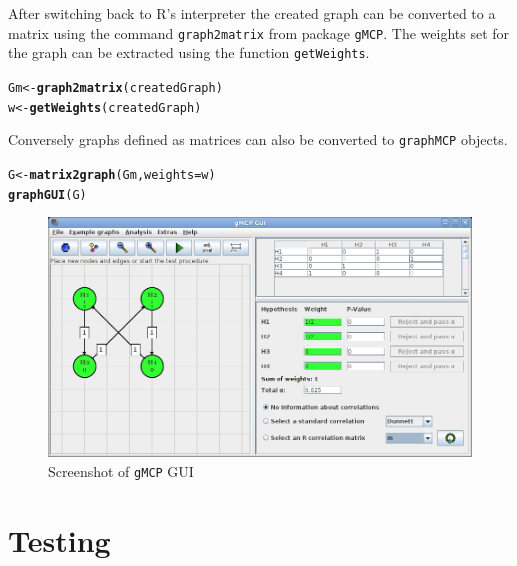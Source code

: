 \documentclass[a4paper, 11pt]{article}\usepackage[]{graphicx}\usepackage[]{color}
\makeatletter
\newcommand{\hlstd}[1]{\textcolor[rgb]{0.345,0.345,0.345}{#1}}%
\newcommand{\hlkwb}[1]{\textcolor[rgb]{0.69,0.353,0.396}{#1}}%
\newcommand{\hlkwc}[1]{\textcolor[rgb]{0.333,0.667,0.333}{#1}}%
\newcommand{\hlkwd}[1]{\textcolor[rgb]{0.737,0.353,0.396}{\textbf{#1}}}%
\newenvironment{kframe}{%
 \def\at@end@of@kframe{}%
 \ifinner\ifhmode%
  \def\at@end@of@kframe{\end{minipage}}%
  \begin{minipage}{\columnwidth}%
 \fi\fi%
 \def\FrameCommand##1{\hskip\@totalleftmargin \hskip-\fboxsep
 \colorbox{shadecolor}{##1}\hskip-\fboxsep
     \hskip-\linewidth \hskip-\@totalleftmargin \hskip\columnwidth}%
 \MakeFramed {\advance\hsize-\width
   \@totalleftmargin\z@ \linewidth\hsize
   \@setminipage}}%
 {\par\unskip\endMakeFramed%
 \at@end@of@kframe}
\newenvironment{knitrout}{}{} %
\newcommand{\gmcp}{\texttt{gMCP}\xspace}
\makeatother
\begin{document}
After switching back to R's interpreter the created graph can be
converted to a matrix using the command \texttt{graph2matrix} from
package \gmcp. The weights set for the graph can be extracted using
the function \texttt{getWeights}. 

\begin{knitrout}
\color{fgcolor}\begin{kframe}
\begin{alltt}
\hlstd{Gm} \hlkwb{<-} \hlkwd{graph2matrix}\hlstd{(createdGraph)}
\hlstd{w} \hlkwb{<-} \hlkwd{getWeights}\hlstd{(createdGraph)}
\end{alltt}
\end{kframe}
\end{knitrout}


Conversely graphs defined as matrices can also be converted to
\texttt{graphMCP} objects.

\begin{knitrout}
\color{fgcolor}\begin{kframe}
\begin{alltt}
\hlstd{G} \hlkwb{<-} \hlkwd{matrix2graph}\hlstd{(Gm,} \hlkwc{weights} \hlstd{= w)}
\hlkwd{graphGUI}\hlstd{(G)}
\end{alltt}
\end{kframe}
\end{knitrout}


\begin{figure}
  \centering
  \includegraphics[width=.95\textwidth]{pictures/example.png}
  
  \caption{Screenshot of \gmcp GUI }
\label{fig:gui}
\end{figure}


\section{Testing}
\label{sec:testing}
\end{document}
